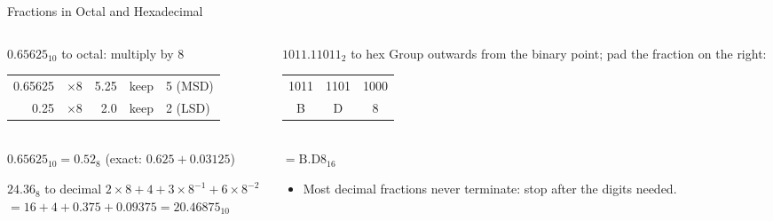 \documentclass[9pt,aspectratio=169,xcolor=table]{beamer}
\begin{document}
\begin{frame}{Fractions in Octal and Hexadecimal}
  \begin{columns}[t]
  \begin{column}{.5\textwidth}
    \begin{block}{$0.65625_{10}$ to octal: multiply by 8}
      \small
      \begin{tabular}{rcrcl}
        0.65625 & $\times 8$ & 5.25 & keep & 5 (MSD) \\
        0.25 & $\times 8$ & 2.0 & keep & 2 (LSD) \\
      \end{tabular}\\[1mm]
      $0.65625_{10} = 0.52_8$ (exact: $0.625 + 0.03125$)
    \end{block}
    \begin{block}{$24.36_8$ to decimal}
      \small $2\!\times\!8 + 4 + 3\!\times\!8^{-1} + 6\!\times\!8^{-2}$\\
      $= 16 + 4 + 0.375 + 0.09375 = 20.46875_{10}$
    \end{block}
  \end{column}
  \begin{column}{.48\textwidth}
    \begin{block}{$1011.11011_2$ to hex}
      \small Group outwards from the binary point; pad the fraction on the \alert{right}:\\[1mm]
      \centering
      \begin{tabular}{ccc}
        1011 & 1101 & 1000 \\
        B & D & 8 \\
      \end{tabular}\\[1mm]
      $= \mathrm{B.D8}_{16}$
    \end{block}
    \begin{itemize}\small
      \item Most decimal fractions never terminate: stop after the digits needed.
    \end{itemize}
  \end{column}
  \end{columns}
\end{frame}
\end{document}
